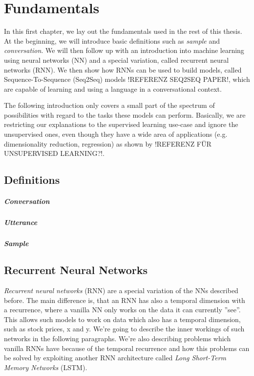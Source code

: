 \chapter{Fundamentals}
\label{chapter:fundamental}
In this first chapter, we lay out the fundamentals used in the rest of this thesis. At the beginning, we will introduce basic definitions such as \emph{sample} and \emph{conversation}. We will then follow up with an introduction into machine learning using neural networks (NN) and a special variation, called recurrent neural networks (RNN). We then show how RNNs can be used to build models, called Sequence-To-Sequence (Seq2Seq) models !REFERENZ SEQ2SEQ PAPER!, which are capable of learning and using a language in a conversational context.

The following introduction only covers a small part of the spectrum of possibilities with regard to the tasks these models can perform. Basically, we are restricting our explanations to the supervised learning use-case and ignore the unsupervised ones, even though they have a wide area of applications (e.g. dimensionality reduction, regression) as shown by !REFERENZ FÜR UNSUPERVISED LEARNING?!.

\section{Definitions}
\paragraph{Conversation} \blindtext
\paragraph{Utterance} \blindtext
\paragraph{Sample} \blindtext

\section{Recurrent Neural Networks}
\emph{Recurrent neural networks} (RNN) are a special variation of the NNs described before. The main difference is, that an RNN has also a temporal dimension with a recurrence, where a vanilla NN only works on the data it can currently ''see''. This allows such models to work on data which also has a temporal dimension, such as stock prices, x and y. We're going to describe the inner workings of such networks in the following paragraphs. We're also describing problems which vanilla RNNs have because of the temporal recurrence and how this problems can be solved by exploiting another RNN architecture called \emph{Long Short-Term Memory Networks} (LSTM).

